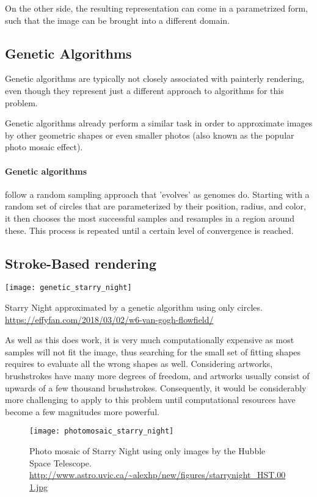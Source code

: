 On the other side, the resulting representation can come in a parametrized form, such that the image can be brought into a different domain.

\subsection{Genetic Algorithms}
Genetic algorithms are typically not closely associated with painterly rendering, even though they represent just a different approach to algorithms for this problem.

Genetic algorithms already perform a similar task in order to approximate images by other geometric shapes or even smaller photos (also known as the popular photo mosaic effect).
\paragraph{Genetic algorithms} follow a random sampling approach that 'evolves' as genomes do.
Starting with a random set of circles that are parameterized by their position, radius, and color, it then chooses the most successful samples and resamples in a region around these.
This process is repeated until a certain level of convergence is reached.


\subsection{Stroke-Based rendering}


\begin{marginfigure}
    \texttt{[image: genetic\_starry\_night]}
    \caption[]{Starry Night approximated by a genetic algorithm using only circles. \url{https://effyfan.com/2018/03/02/w6-van-gogh-flowfield/}}
\end{marginfigure}

As well as this does work, it is very much computationally expensive as most samples will not fit the image, thus searching for the small set of fitting shapes requires to evaluate all the wrong shapes as well.
Considering artworks, brushstrokes have many more degrees of freedom, and artworks usually consist of upwards of a few thousand brushstrokes.
Consequently, it would be considerably more challenging to apply to this problem until computational resources have become a few magnitudes more powerful.

\begin{figure}
    \texttt{[image: photomosaic\_starry\_night]}
    \caption[]{Photo mosaic of Starry Night using only images by the Hubble Space Telescope. \url{http://www.astro.uvic.ca/~alexhp/new/figures/starrynight_HST.001.jpg}}
\end{figure}

